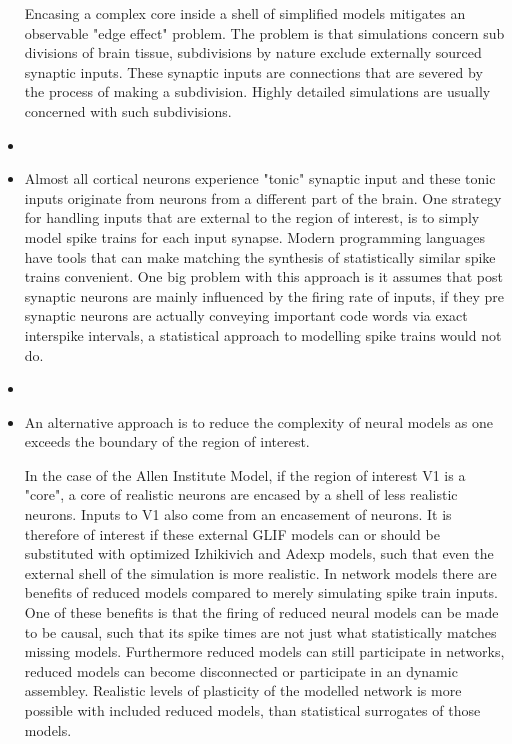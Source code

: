 \documentclass{article}
\begin{document}
\begin{itemize}
Encasing a complex core inside a shell of simplified models mitigates an observable "edge effect" problem. The problem is that simulations concern sub divisions of brain tissue, subdivisions by nature exclude externally sourced synaptic inputs. These synaptic inputs are connections that are severed by the process of making a subdivision. Highly detailed simulations are usually concerned with such subdivisions.

\item 
\item Almost all cortical neurons experience "tonic" synaptic input and these tonic inputs originate from neurons from a different part of the brain. One strategy for handling inputs that are external to the region of interest, is to simply model spike trains for each input synapse. Modern programming languages have tools that can make matching the synthesis of statistically similar spike trains convenient. One big problem with this approach is it assumes that post synaptic neurons are mainly influenced by the firing rate of inputs, if they pre synaptic neurons are actually conveying important code words via exact interspike intervals, a statistical approach to modelling spike trains would not do.
\item 
\item  An alternative approach is to reduce the complexity of neural models as one exceeds the boundary of the region of interest.

In the case of the Allen Institute Model, if the region of interest V1 is a "core", a core of realistic neurons are encased by a shell of less realistic neurons. Inputs to V1 also come from an encasement of neurons. It is therefore of interest if these external GLIF models can or should be substituted with optimized Izhikivich and Adexp models, such that even the external shell of the simulation is more realistic. In network models there are benefits of reduced models compared to merely simulating spike train inputs. One of these benefits is that the firing of reduced neural models can be made to be causal, such that its spike times are not just what statistically matches missing models. Furthermore reduced models can still participate in networks, reduced models can become disconnected or participate in an dynamic assembley. Realistic levels of plasticity of the modelled network is more possible with included reduced models, than statistical surrogates of those models.


\end{itemize}
\end{document}
